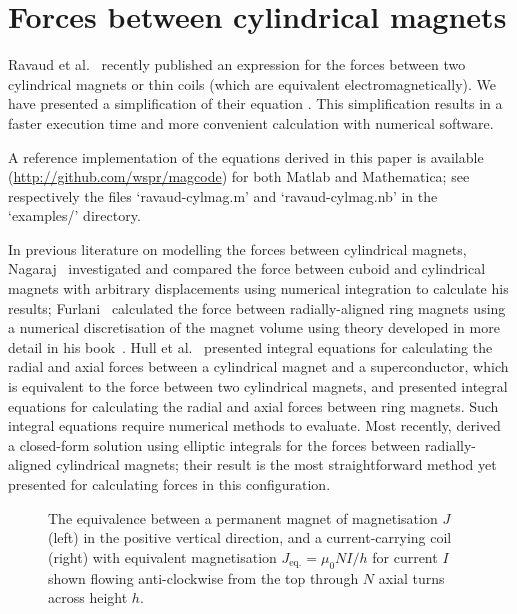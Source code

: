 \section{Forces between cylindrical magnets}

Ravaud et al.~\cite{ravaud2010-ietm} recently published an expression for the forces between two cylindrical magnets or thin coils (which are equivalent electromagnetically). We have presented a simplification of their equation \parencite{robertson2011-ietm}.
This simplification results in a faster execution time and more convenient calculation with numerical software.

A reference implementation of the equations derived in this paper is available (\url{http://github.com/wspr/magcode}) for both Matlab and Mathematica; see respectively the files `ravaud-cylmag.m' and `ravaud-cylmag.nb' in the `examples/' directory.

In previous literature on modelling the forces between cylindrical magnets,
Nagaraj~\cite{nagaraj1988} investigated and compared the force between cuboid and cylindrical magnets with arbitrary displacements using numerical integration to calculate his results; Furlani~\cite{furlani1993-ietm,furlani1993-ietm-coupl} calculated the force between radially-aligned ring magnets using a numerical discretisation of the magnet volume using theory developed in more detail in his book~\cite{furlani2001-magnetbook}. Hull et al.~\cite{hull1999-japplphys} presented integral equations for calculating the radial and axial forces between a cylindrical magnet and a superconductor, which is equivalent to the force between two cylindrical magnets, and \textcite{bassani2006-trib-int} presented integral equations for calculating the radial and axial forces between ring magnets. Such integral equations require numerical methods to evaluate.
Most recently, \textcite{ravaud2010-ietm} derived a closed-form solution using elliptic integrals for the forces between radially-aligned cylindrical magnets; their result is the most straightforward method yet presented for calculating forces in this configuration.

\begin{figure}
\centering
{}
\caption{The equivalence between a permanent magnet of magnetisation $J$ (left) in the positive vertical direction, and a current-carrying coil (right) with equivalent magnetisation $J_{\text{eq.}}=\mu_0 N I/h$ for current $I$ shown flowing anti-clockwise from the top through $N$ axial turns across height $h$.}
\end{figure}


